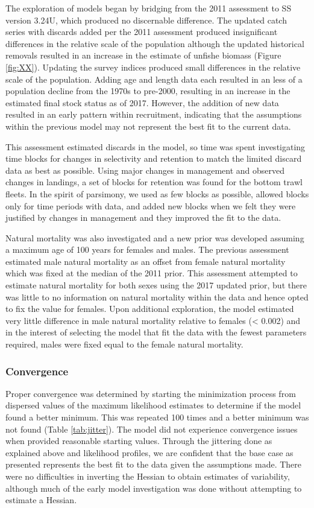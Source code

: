 \documentclass[12pt,]{article}
\begin{document}
The exploration of models began by bridging from the 2011 assessment to
SS version 3.24U, which produced no discernable difference. The updated
catch series with discards added per the 2011 assessment produced
insignificant differences in the relative scale of the population
although the updated historical removals resulted in an increase in the
estimate of unfishe biomass (Figure \ref{fig:XX}). Updating the survey
indices produced small differences in the relative scale of the
population. Adding age and length data each resulted in an less of a
population decline from the 1970s to pre-2000, resulting in an increase
in the estimated final stock status as of 2017. However, the addition of
new data resulted in an early pattern within recruitment, indicating
that the assumptions within the previous model may not represent the
best fit to the current data.

This assessment estimated discards in the model, so time was spent
investigating time blocks for changes in selectivity and retention to
match the limited discard data as best as possible. Using major changes
in management and observed changes in landings, a set of blocks for
retention was found for the bottom trawl fleets. In the spirit of
parsimony, we used as few blocks as possible, allowed blocks only for
time periods with data, and added new blocks when we felt they were
justified by changes in management and they improved the fit to the
data.

Natural mortality was also investigated and a new prior was developed
assuming a maximum age of 100 years for females and males. The previous
assessment estimated male natural mortality as an offset from female
natural mortality which was fixed at the median of the 2011 prior. This
assessment attempted to estimate natural mortality for both sexes using
the 2017 updated prior, but there was little to no information on
natural mortality within the data and hence opted to fix the value for
females. Upon additional exploration, the model estimated very little
difference in male natural mortality relative to females (\textless{}
0.002) and in the interest of selecting the model that fit the data with
the fewest parameters required, males were fixed equal to the female
natural mortality.

\subsubsection{Convergence}\label{convergence}

Proper convergence was determined by starting the minimization process
from dispersed values of the maximum likelihood estimates to determine
if the model found a better minimum. This was repeated 100 times and a
better minimum was not found (Table \ref{tab:jitter}). The model did not
experience convergence issues when provided reasonable starting values.
Through the jittering done as explained above and likelihood profiles,
we are confident that the base case as presented represents the best fit
to the data given the assumptions made. There were no difficulties in
inverting the Hessian to obtain estimates of variability, although much
of the early model investigation was done without attempting to estimate
a Hessian.
\end{document}
